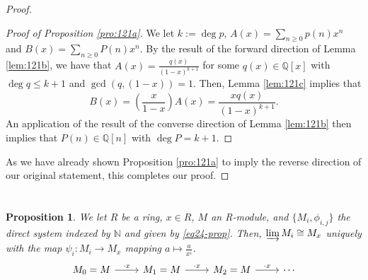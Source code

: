 \documentclass[english]{article}
\newcommand{\NN}{\mathbb{N}}
\newcommand{\QQ}{\mathbb{Q}}
\newenvironment{subproof}[1][\proofname]{%
	\renewcommand{\qedsymbol}{$\blacksquare$}%
	\begin{proof}[#1]%
	}{%
	\end{proof}%
}
\newcommand{\prob}[1]{\setcounter{section}{#1-1}\section{}}
\newtheorem*{prop*}{Proposition}
\theoremstyle{remark}
\theoremstyle{definition}
\newcommand{\colim}{\varinjlim}
\begin{document}
\begin{proof}
\begin{subproof}[Proof of Proposition \ref{pro:121a}]
 We let $k:=\deg p$, $A(x)=\sum_{n\geq 0} p(n)x^n$ and $B(x)=\sum_{n\geq 0}P(n)x^n$. By the result of the forward direction of Lemma \ref{lem:121b}, we have that $A(x)=\frac{q(x)}{(1-x)^{k+1}}$ for some $q(x)\in \QQ[x]$ with $\deg q\leq k+1$ and $\gcd(q,(1-x))=1$. Then, Lemma \ref{lem:121c} implies that $$B(x)=\left(\frac{x}{1-x}\right)A(x)=\frac{xq(x)}{(1-x)^{k+1}}.$$ An application of the result of the converse direction of Lemma \ref{lem:121b} then implies that $P(n)\in \QQ[n]$ with $\deg P=k+1$. 
\end{subproof}
As we have already shown Proposition \ref{pro:121a} to imply the reverse direction of our original statement, this completes our proof.
\end{proof}
\prob{24}
\begin{prop*}
	We let $R$ be a ring, $x\in R$, $M$ an R-module, and $\{M_i,\phi_{i,j}\}$ the direct system indexed by $\NN$ and given by \eqref{eq24-prop}. Then, $\colim M_i\cong M_x$ uniquely with the map $\psi_i:M_i\to M_x$ mapping $a\mapsto \frac{a}{x^i}$. 
	\begin{equation}\label{eq24-prop}\begin{tikzcd}
		M_0=M\arrow[r,"\cdot x"]&M_1=M\arrow[r,"\cdot x"]&M_2=M\arrow[r,"\cdot x"]&\cdots
	\end{tikzcd}\end{equation}
\end{prop*}
\end{document}
